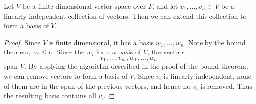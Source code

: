 \documentclass{article}
\begin{document}
  \begin{cthm}
    Let $V$ be a finite dimensional vector space over $F$, and let $v_1, \ldots, v_m \in V$ be a linearly independent collection of vectors. Then we can extend this collection to form a basis of $V$.
  \end{cthm}
  \begin{proof}
    Since $V$ is finite dimensional, it has a basis $w_1, \ldots, w_n$. Note by the bound theorem, $m \leq n$. Since the $w_i$ form a basis of $V$, the vectors
    \[
      v_1, \ldots, v_m, w_1, \ldots, w_n
    \]
    span $V$. By applying the algorithm described in the proof of the bound theorem, we can remove vectors to form a basis of $V$. Since $v_i$ is linearly independent, none of them are in the span of the previous vectors, and hence no $v_i$ is removed. Thus the resulting basis contains all $v_i$.
  \end{proof}
\end{document}
